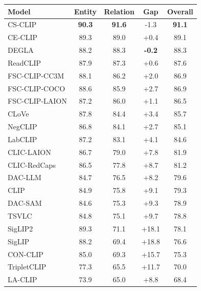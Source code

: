 \begin{tabular}{@{}lcccc@{}}
\toprule
\textbf{Model} & \textbf{Entity} & \textbf{Relation} & \textbf{Gap} & \textbf{Overall} \\
\midrule
CS-CLIP & \textbf{90.3} & \textbf{91.6} & -1.3 & \textbf{91.1} \\
CE-CLIP & 89.3 & 89.0 & +0.4 & 89.1 \\
DEGLA & 88.2 & 88.3 & \textbf{-0.2} & 88.3 \\
ReadCLIP & 87.9 & 87.3 & +0.6 & 87.6 \\
FSC-CLIP-CC3M & 88.1 & 86.2 & +2.0 & 86.9 \\
FSC-CLIP-COCO & 88.6 & 85.9 & +2.7 & 86.9 \\
FSC-CLIP-LAION & 87.2 & 86.0 & +1.1 & 86.5 \\
CLoVe & 87.8 & 84.4 & +3.4 & 85.7 \\
NegCLIP & 86.8 & 84.1 & +2.7 & 85.1 \\
LabCLIP & 87.2 & 83.1 & +4.1 & 84.6 \\
CLIC-LAION & 86.7 & 79.0 & +7.8 & 81.9 \\
CLIC-RedCaps & 86.5 & 77.8 & +8.7 & 81.2 \\
DAC-LLM & 84.7 & 76.5 & +8.2 & 79.6 \\
CLIP & 84.9 & 75.8 & +9.1 & 79.3 \\
DAC-SAM & 84.6 & 75.3 & +9.3 & 78.9 \\
TSVLC & 84.8 & 75.1 & +9.7 & 78.8 \\
SigLIP2 & 89.3 & 71.1 & +18.1 & 78.1 \\
SigLIP & 88.2 & 69.4 & +18.8 & 76.6 \\
CON-CLIP & 85.0 & 69.3 & +15.7 & 75.3 \\
TripletCLIP & 77.3 & 65.5 & +11.7 & 70.0 \\
LA-CLIP & 73.9 & 65.0 & +8.8 & 68.4 \\
\bottomrule
\end{tabular}